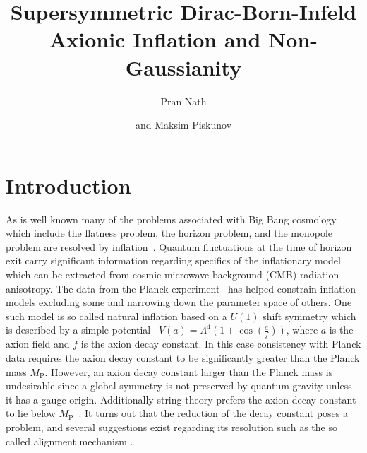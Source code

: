 \documentclass[a4paper,11pt]{article}
\title{\boldmath Supersymmetric Dirac-Born-Infeld Axionic Inflation and Non-Gaussianity}
\author{Pran Nath}
\author{and Maksim Piskunov}
\affiliation{Department of Physics, Northeastern University,\\Boston, MA 02115-5000, USA}
\begin{document}
 
\maketitle
\flushbottom

\section{Introduction}
  As is well known many of the problems associated with Big Bang cosmology which include
  the flatness problem, the horizon problem, and the monopole problem are resolved by inflation~\cite{Guth:1980zm,Starobinsky:1980te,Linde:1981mu,Albrecht:1982wi,Sato,Linde:1983gd}.
  Quantum fluctuations at the time of horizon exit carry significant information regarding specifics
  of the inflationary model~\cite{Mukhanov+,Cheung:2007st}
  which can be extracted from cosmic microwave background (CMB) radiation anisotropy.
  The data from the Planck experiment~\cite{Adam:2015rua,Ade:2015lrj,Array:2015xqh} has helped
  constrain inflation models excluding some and narrowing down the parameter space of others.
  One such model is so called natural inflation based on a $U(1)$ shift symmetry
  which is described by a simple potential~\cite{Freese:1990rb,Adams:1992bn}
  $V(a) = \Lambda^4 \left(1+ \cos(\frac{a}{f})\right)$,
  where $a$ is the axion field and $f$ is the axion decay constant.
  In this case consistency with Planck data requires the axion decay constant to be significantly greater than the Planck mass $M_\text{P}$.
  However, an axion decay constant larger than the Planck mass is undesirable since a global symmetry is not preserved by quantum gravity
  unless it has a gauge origin. Additionally string theory prefers the axion decay constant to lie below $M_\text{P}$~\cite{Banks:2003sx,Svrcek:2006yi}.
  It turns out that the reduction of the decay constant poses a problem, and several suggestions exist regarding its resolution such as the
  so called alignment mechanism \cite{Kim:2004rp,Long:2014dta}.
\end{document}
